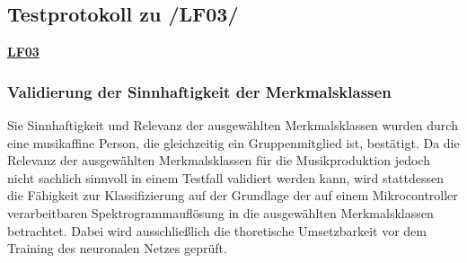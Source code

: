 \subsection{Testprotokoll zu /LF03/}
\textbf{\hyperlink{lf-nn-01}{LF03}}

\subsubsection{Validierung der Sinnhaftigkeit der Merkmalsklassen}
Sie Sinnhaftigkeit und Relevanz der ausgewählten Merkmalsklassen wurden durch eine musikaffine Person, die gleichzeitig ein Gruppenmitglied ist, bestätigt.
Da die Relevanz der ausgewählten Merkmalsklassen für die Musikproduktion jedoch nicht sachlich sinnvoll in einem Testfall validiert werden kann, wird stattdessen die Fähigkeit zur Klassifizierung auf der Grundlage der auf einem Mikrocontroller verarbeitbaren Spektrogrammauflösung in die ausgewählten Merkmalsklassen betrachtet. Dabei wird ausschließlich die thoretische Umsetzbarkeit vor dem Training des neuronalen Netzes geprüft.


